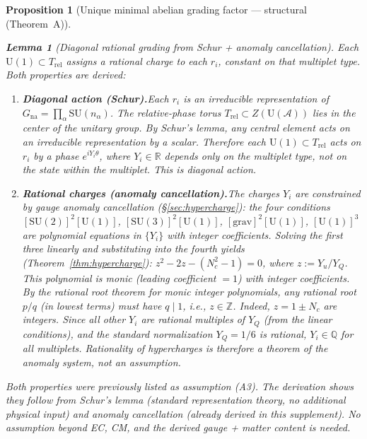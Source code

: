 \documentclass[11pt,a4paper]{article}
\newtheorem{lemma}[theorem]{Lemma}
\newtheorem{proposition}[theorem]{Proposition}
\theoremstyle{definition}
\newcommand{\SU}{\mathrm{SU}}
\newcommand{\U}{\mathrm{U}}
\begin{document}
\begin{proposition}[Unique minimal abelian grading factor ---
structural (Theorem~A)]
\begin{lemma}[Diagonal rational grading from Schur + anomaly cancellation]
\label{lem:A3_derived}
Each $\U(1) \subset T_{\mathrm{rel}}$ assigns a rational charge to each
$r_i$, constant on that multiplet type.  Both properties are derived:
\begin{enumerate}[label=(\alph*),nosep]
  \item \textbf{Diagonal action (Schur).}\quad Each $r_i$ is an
  irreducible representation of $G_{\mathrm{na}} = \prod_\alpha
  \SU(n_\alpha)$.  The relative-phase torus
  $T_{\mathrm{rel}} \subset Z(\mathrm{U}(\mathcal{A}))$ lies in the
  center of the unitary group.  By Schur's lemma, any central element
  acts on an irreducible representation by a scalar.  Therefore each
  $\U(1) \subset T_{\mathrm{rel}}$ acts on $r_i$ by a phase
  $e^{i Y_i \theta}$, where $Y_i \in \mathbb{R}$ depends only on the
  multiplet type, not on the state within the multiplet.  This is
  diagonal action.
  \item \textbf{Rational charges (anomaly cancellation).}\quad The
  charges $Y_i$ are constrained by gauge anomaly cancellation
  (\S\ref{sec:hypercharge}): the four conditions
  $[\SU(2)]^2[\U(1)]$, $[\SU(3)]^2[\U(1)]$,
  $[\mathrm{grav}]^2[\U(1)]$, $[\U(1)]^3$ are polynomial equations
  in $\{Y_i\}$ with integer coefficients.  Solving the first three
  linearly and substituting into the fourth yields
  (Theorem~\ref{thm:hypercharge}):
  $z^2 - 2z - (N_c^2 - 1) = 0$, where $z := Y_u / Y_Q$.
  This polynomial is \emph{monic} (leading coefficient $= 1$) with
  integer coefficients.  By the rational root theorem for monic
  integer polynomials, any rational root $p/q$ (in lowest terms)
  must have $q \mid 1$, i.e., $z \in \mathbb{Z}$.  Indeed,
  $z = 1 \pm N_c$ are integers.  Since all other $Y_i$ are rational
  multiples of $Y_Q$ (from the linear conditions), and the standard
  normalization $Y_Q = 1/6$ is rational, $Y_i \in \mathbb{Q}$
  for all multiplets.  Rationality of hypercharges is therefore a
  \emph{theorem} of the anomaly system, not an assumption.
\end{enumerate}
\end{lemma}

\noindent Both properties were previously listed as assumption (A3).
The derivation shows they follow from Schur's lemma (standard
representation theory, no additional physical input) and anomaly
cancellation (already derived in this supplement).  No assumption
beyond EC, CM, and the derived gauge + matter content is needed.


\end{proposition}
\end{document}
